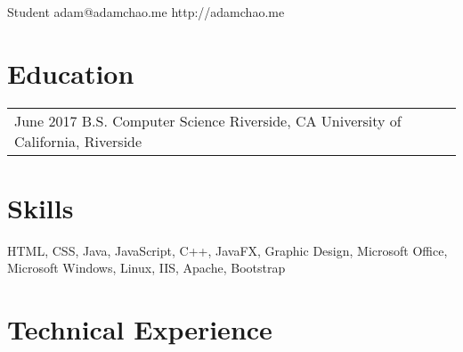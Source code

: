\documentclass[print]{friggeri-cv} %
\makeatletter
\renewenvironment{entrylist}{%
	\par\begin{tabular*}{\textwidth}{@{\extracolsep{\fill}}ll}
	}{%
\end{tabular*}\par
}
\makeatother
\begin{document}
{Student} %
{adam@adamchao.me}
{http://adamchao.me}

\hfill

\section{Education}
\begin{entrylist}
\entry
	{June 2017}
	{B.S. Computer Science}
	{Riverside, CA}
	{University of California, Riverside}
\end{entrylist}


\section{Skills}
HTML, CSS, Java, JavaScript, C++, JavaFX, Graphic Design, Microsoft Office, Microsoft Windows, Linux, IIS, Apache, Bootstrap


\section{Technical Experience}
\end{document}
